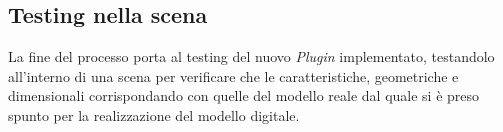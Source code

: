\subsection{Testing nella scena}
La fine del processo porta al testing del nuovo \emph{Plugin} implementato, testandolo all'interno
di una scena per verificare che le caratteristiche, geometriche e dimensionali corrispondando con quelle
del modello reale dal quale si è preso spunto per la realizzazione del modello digitale.\\
